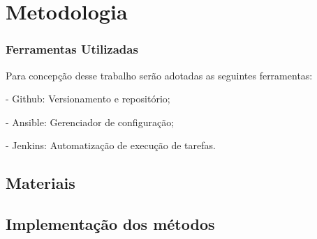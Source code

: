 



\chapter{Metodologia}\label{cap:metodologia}

\subsection{Ferramentas Utilizadas}
Para concepção desse trabalho serão adotadas as seguintes ferramentas:

- Github: Versionamento e repositório;

- Ansible: Gerenciador de configuração;

- Jenkins: Automatização de execução de tarefas.

\section{Materiais}






\section{Implementação dos métodos}



